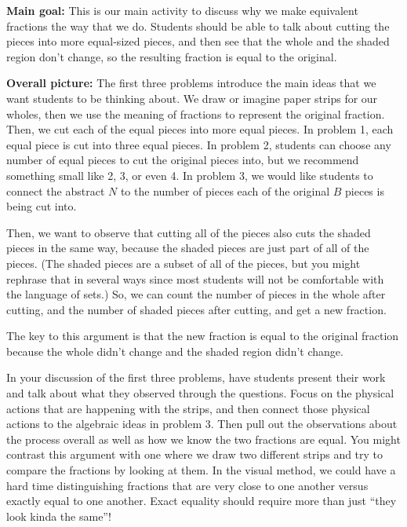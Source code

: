 \documentclass{ximera}
\begin{document}
\begin{instructorNotes}

{\bf Main goal:} This is our main activity to discuss why we make equivalent fractions the way that we do. Students should be able to talk about cutting the pieces into more equal-sized pieces, and then see that the whole and the shaded region don't change, so the resulting fraction is equal to the original.

{\bf Overall picture:}
The first three problems introduce the main ideas that we want students to be thinking about. We draw or imagine paper strips for our wholes, then we use the meaning of fractions to represent the original fraction. Then, we cut each of the equal pieces into more equal pieces. In problem 1, each equal piece is cut into three equal pieces. In problem 2, students can choose any number of equal pieces to cut the original pieces into, but we recommend something small like 2, 3, or even 4. In problem 3, we would like students to connect the abstract $N$ to the number of pieces each of the original $B$ pieces is being cut into. 

Then, we want to observe that cutting all of the pieces also cuts the shaded pieces in the same way, because the shaded pieces are just part of all of the pieces. (The shaded pieces are a subset of all of the pieces, but you might rephrase that in several ways since most students will not be comfortable with the language of sets.) So, we can count the number of pieces in the whole after cutting, and the number of shaded pieces after cutting, and get a new fraction.

The key to this argument is that the new fraction is equal to the original fraction because the whole didn't change and the shaded region didn't change. 

In your discussion of the first three problems, have students present their work and talk about what they observed through the questions. Focus on the physical actions that are happening with the strips, and then connect those physical actions to the algebraic ideas in problem 3. Then pull out the observations about the process overall as well as how we know the two fractions are equal. You might contrast this argument with one where we draw two different strips and try to compare the fractions by looking at them. In the visual method, we could have a hard time distinguishing fractions that are very close to one another versus exactly equal to one another. Exact equality should require more than just ``they look kinda the same''!


\end{instructorNotes}
\end{document}
